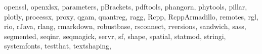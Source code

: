 \documentclass[
]{book}
\newenvironment{Shaded}{\begin{snugshade}}{\end{snugshade}}
\newcommand{\NormalTok}[1]{#1}
\newcommand{\StringTok}[1]{\textcolor[rgb]{0.31,0.60,0.02}{#1}}
\begin{document}
\begin{Shaded}
\begin{Highlighting}[]
  \StringTok{\textquotesingle{}openssl\textquotesingle{}}\NormalTok{, }\StringTok{\textquotesingle{}openxlsx\textquotesingle{}}\NormalTok{, }\StringTok{\textquotesingle{}parameters\textquotesingle{}}\NormalTok{, }\StringTok{\textquotesingle{}pBrackets\textquotesingle{}}\NormalTok{, }\StringTok{\textquotesingle{}pdftools\textquotesingle{}}\NormalTok{, }\StringTok{\textquotesingle{}phangorn\textquotesingle{}}\NormalTok{, }\StringTok{\textquotesingle{}phytools\textquotesingle{}}\NormalTok{,}
  \StringTok{\textquotesingle{}pillar\textquotesingle{}}\NormalTok{, }\StringTok{\textquotesingle{}plotly\textquotesingle{}}\NormalTok{, }\StringTok{\textquotesingle{}processx\textquotesingle{}}\NormalTok{, }\StringTok{\textquotesingle{}proxy\textquotesingle{}}\NormalTok{, }\StringTok{\textquotesingle{}qgam\textquotesingle{}}\NormalTok{, }\StringTok{\textquotesingle{}quantreg\textquotesingle{}}\NormalTok{, }\StringTok{\textquotesingle{}ragg\textquotesingle{}}\NormalTok{, }\StringTok{\textquotesingle{}Rcpp\textquotesingle{}}\NormalTok{,}
  \StringTok{\textquotesingle{}RcppArmadillo\textquotesingle{}}\NormalTok{, }\StringTok{\textquotesingle{}remotes\textquotesingle{}}\NormalTok{, }\StringTok{\textquotesingle{}rgl\textquotesingle{}}\NormalTok{, }\StringTok{\textquotesingle{}rio\textquotesingle{}}\NormalTok{, }\StringTok{\textquotesingle{}rJava\textquotesingle{}}\NormalTok{, }\StringTok{\textquotesingle{}rlang\textquotesingle{}}\NormalTok{, }\StringTok{\textquotesingle{}rmarkdown\textquotesingle{}}\NormalTok{, }\StringTok{\textquotesingle{}robustbase\textquotesingle{}}\NormalTok{,}
  \StringTok{\textquotesingle{}rsconnect\textquotesingle{}}\NormalTok{, }\StringTok{\textquotesingle{}rversions\textquotesingle{}}\NormalTok{, }\StringTok{\textquotesingle{}sandwich\textquotesingle{}}\NormalTok{, }\StringTok{\textquotesingle{}sass\textquotesingle{}}\NormalTok{, }\StringTok{\textquotesingle{}segmented\textquotesingle{}}\NormalTok{, }\StringTok{\textquotesingle{}seqinr\textquotesingle{}}\NormalTok{, }\StringTok{\textquotesingle{}seqmagick\textquotesingle{}}\NormalTok{, }\StringTok{\textquotesingle{}servr\textquotesingle{}}\NormalTok{,}
  \StringTok{\textquotesingle{}sf\textquotesingle{}}\NormalTok{, }\StringTok{\textquotesingle{}shape\textquotesingle{}}\NormalTok{, }\StringTok{\textquotesingle{}spatial\textquotesingle{}}\NormalTok{, }\StringTok{\textquotesingle{}statmod\textquotesingle{}}\NormalTok{, }\StringTok{\textquotesingle{}stringi\textquotesingle{}}\NormalTok{, }\StringTok{\textquotesingle{}systemfonts\textquotesingle{}}\NormalTok{, }\StringTok{\textquotesingle{}testthat\textquotesingle{}}\NormalTok{, }\StringTok{\textquotesingle{}textshaping\textquotesingle{}}\NormalTok{,}

\end{Highlighting}
\end{Shaded}
\end{document}

